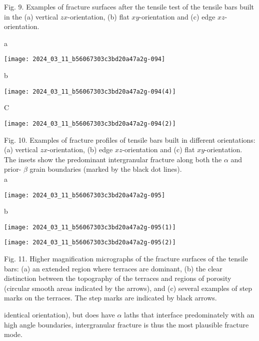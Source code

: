 \documentclass[10pt]{article}
\begin{document}
Fig. 9. Examples of fracture surfaces after the tensile test of the tensile bars built in the (a) vertical $z x$-orientation, (b) flat $x y$-orientation and (c) edge $x z$-orientation.

a

\begin{center}
\texttt{[image: 2024\_03\_11\_b56067303c3bd20a47a2g-094]}
\end{center}

b

\begin{center}
\texttt{[image: 2024\_03\_11\_b56067303c3bd20a47a2g-094(4)]}
\end{center}

C

\begin{center}
\texttt{[image: 2024\_03\_11\_b56067303c3bd20a47a2g-094(2)]}
\end{center}

Fig. 10. Examples of fracture profiles of tensile bars built in different orientations: (a) vertical $z x$-orientation, (b) edge $x z$-orientation and (c) flat $x y$-orientation. The insets show the predominant intergranular fracture along both the $\alpha$ and prior- $\beta$ grain boundaries (marked by the black dot lines).\\
a

\begin{center}
\texttt{[image: 2024\_03\_11\_b56067303c3bd20a47a2g-095]}
\end{center}

b

\begin{center}
\texttt{[image: 2024\_03\_11\_b56067303c3bd20a47a2g-095(1)]}
\end{center}

\begin{center}
\texttt{[image: 2024\_03\_11\_b56067303c3bd20a47a2g-095(2)]}
\end{center}

Fig. 11. Higher magnification micrographs of the fracture surfaces of the tensile bars: (a) an extended region where terraces are dominant, (b) the clear distinction between the topography of the terraces and regions of porosity (circular smooth areas indicated by the arrows), and (c) several examples of step marks on the terraces. The step marks are indicated by black arrows.

identical orientation), but does have $\alpha$ laths that interface predominately with an high angle boundaries, intergranular fracture is thus the most plausible fracture mode.
\end{document}
